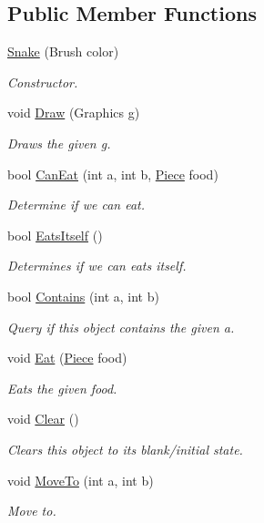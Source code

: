 \subsection*{Public Member Functions}
\begin{DoxyCompactItemize}
\item 
\mbox{\hyperlink{class_snake_1_1_snake_a8380566e1a2f23802f4656a72da76412}{Snake}} (Brush color)
\begin{DoxyCompactList}\small\item\em Constructor. \end{DoxyCompactList}\item 
void \mbox{\hyperlink{class_snake_1_1_snake_ae1a73925b1a95fb087c26d87fe16a79f}{Draw}} (Graphics g)
\begin{DoxyCompactList}\small\item\em Draws the given g. \end{DoxyCompactList}\item 
bool \mbox{\hyperlink{class_snake_1_1_snake_a87e93fe5139973a667ecda894769349f}{Can\+Eat}} (int a, int b, \mbox{\hyperlink{class_snake_1_1_piece}{Piece}} food)
\begin{DoxyCompactList}\small\item\em Determine if we can eat. \end{DoxyCompactList}\item 
bool \mbox{\hyperlink{class_snake_1_1_snake_a1b5785fedc244882f02fa9145141c432}{Eats\+Itself}} ()
\begin{DoxyCompactList}\small\item\em Determines if we can eats itself. \end{DoxyCompactList}\item 
bool \mbox{\hyperlink{class_snake_1_1_snake_a06b5d8a17c2d94cd6c979cef1c275eda}{Contains}} (int a, int b)
\begin{DoxyCompactList}\small\item\em Query if this object contains the given a. \end{DoxyCompactList}\item 
void \mbox{\hyperlink{class_snake_1_1_snake_a68e6b4ee9071abc4f25805d920785a19}{Eat}} (\mbox{\hyperlink{class_snake_1_1_piece}{Piece}} food)
\begin{DoxyCompactList}\small\item\em Eats the given food. \end{DoxyCompactList}\item 
void \mbox{\hyperlink{class_snake_1_1_snake_afdb48abfc8554f6b2f4220cadc751879}{Clear}} ()
\begin{DoxyCompactList}\small\item\em Clears this object to its blank/initial state. \end{DoxyCompactList}\item 
void \mbox{\hyperlink{class_snake_1_1_snake_a282122ce2c3e9e54a6aaca3f43ed1b44}{Move\+To}} (int a, int b)
\begin{DoxyCompactList}\small\item\em Move to. \end{DoxyCompactList}\end{DoxyCompactItemize}
